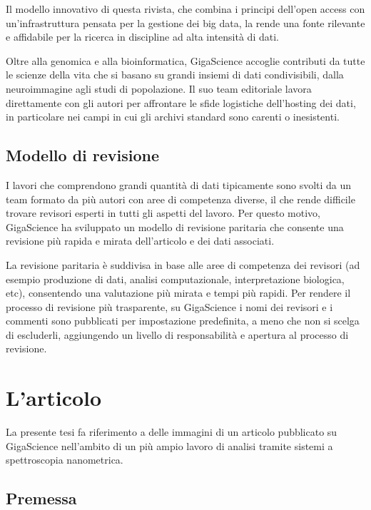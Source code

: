\documentclass[../main.tex]{subfiles}
\begin{document}
Il modello innovativo di questa rivista, che combina i principi dell’open access con un’infrastruttura pensata per la gestione dei big data, la rende una fonte rilevante e affidabile per la ricerca in discipline ad alta intensità di dati.

Oltre alla genomica e alla bioinformatica, GigaScience accoglie contributi da tutte le scienze della vita che si basano su grandi insiemi di dati condivisibili, dalla neuroimmagine agli studi di popolazione.
Il suo team editoriale lavora direttamente con gli autori per affrontare le sfide logistiche dell'hosting dei dati, in particolare nei campi in cui gli archivi standard sono carenti o inesistenti.

\subsection{Modello di revisione}

I lavori che comprendono grandi quantità di dati tipicamente sono svolti da un team formato da più autori con aree di competenza diverse, il che rende difficile trovare revisori esperti in tutti gli aspetti del lavoro.
Per questo motivo, GigaScience ha sviluppato un modello di revisione paritaria  che consente una revisione più rapida e mirata dell'articolo e dei dati associati.

La revisione paritaria è suddivisa in base alle aree di competenza dei revisori (ad esempio produzione di dati, analisi computazionale, interpretazione biologica, etc), consentendo una valutazione più mirata e tempi più rapidi.
Per rendere il processo di revisione più trasparente, su GigaScience i nomi dei revisori e i commenti sono pubblicati per impostazione predefinita, a meno che non si scelga di escluderli, aggiungendo un livello di responsabilità e apertura al processo di revisione.

\section{L'articolo}

La presente tesi fa riferimento a delle immagini di un articolo pubblicato su GigaScience nell’ambito di un più ampio lavoro di analisi tramite sistemi a spettroscopia nanometrica.\cite{ssnombacter_data}

\subsection{Premessa}
\end{document}
